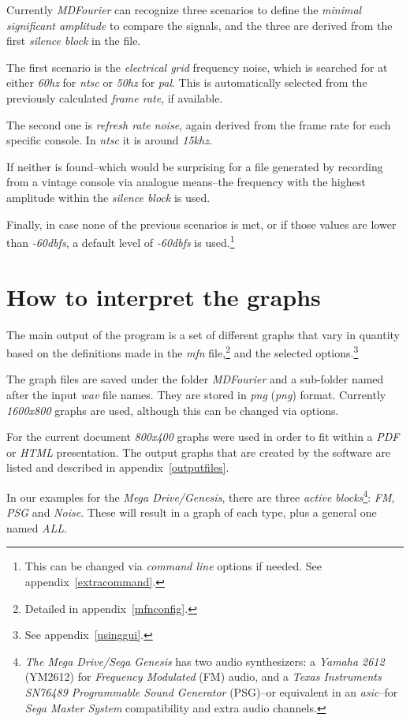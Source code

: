 \documentclass[10pt,a4paper]{report}
\newcommand{\define}[1]{\textit{\acrlong{#1}} (\textit{\acrshort{#1}})}
\newcommand{\ac}[1]{\textit{\mbox{\acrshort{#1}}}}
\newcommand{\hz}[1]{\textit{\mbox{#1\acrshort{hz}}}}
\newcommand{\khz}[1]{\textit{\mbox{#1\acrshort{khz}}}}
\newcommand{\db}[1]{\textit{\mbox{#1\acrshort{dbfs}}}}
\begin{document}
Currently \textit{MDFourier} can recognize three scenarios to define the \textit{minimal significant amplitude} to compare the signals, and the three are derived from the first \textit{silence block} in the file.

The first scenario is the \textit{electrical grid} frequency noise, which is searched for at either \hz{60} for \ac{ntsc} or \hz{50} for \ac{pal}. This is automatically selected from the previously calculated \textit{frame rate}, if available.

The second one is \textit{refresh rate noise}, again derived from the frame rate for each specific console. In \ac{ntsc} it is around \khz{15}. 

If neither is found--which would be surprising for a file generated by recording from a vintage console via analogue means--the frequency with the highest amplitude within the \textit{silence block} is used. 

Finally, in case none of the previous scenarios is met, or if those values are lower than \db{-60}, a default level of \db{-60} is used.\footnote{This can be changed via \textit{command line} options if needed. See appendix~\ref{extracommand}.}

\chapter{How to interpret the graphs}
\label{howtographs}

The main output of the program is a set of different graphs that vary in quantity based on the definitions made in the \textit{mfn} file,\footnote{Detailed in appendix~\ref{mfnconfig}.} and the selected options.\footnote{See appendix~\ref{usinggui}.}

The graph files are saved under the folder \textit{MDFourier} and a sub-folder named after the input \ac{wav} file names. They are stored in \define{png} format. Currently \textit{1600x800} graphs are used, although this can be changed via options. 

For the current document \textit{800x400} graphs were used in order to fit within a \textit{PDF} or \textit{HTML} presentation. The output graphs that are created by the software are listed and described in appendix~\ref{outputfiles}.

In our examples for the \textit{Mega Drive/Genesis}, there are three \textit{active blocks}\footnote{\textit{The Mega Drive/Sega Genesis} has two audio synthesizers: a \textit{Yamaha 2612} (YM2612) for \textit{Frequency Modulated} (FM) audio, and a \textit{Texas Instruments SN76489 Programmable Sound Generator} (PSG)--or equivalent in an \ac{asic}--for \textit{Sega Master System} compatibility and extra audio channels.}: \textit{FM}, \textit{PSG} and \textit{Noise}. These will result in a graph of each type, plus a general one named \textit{ALL}.
\end{document}
